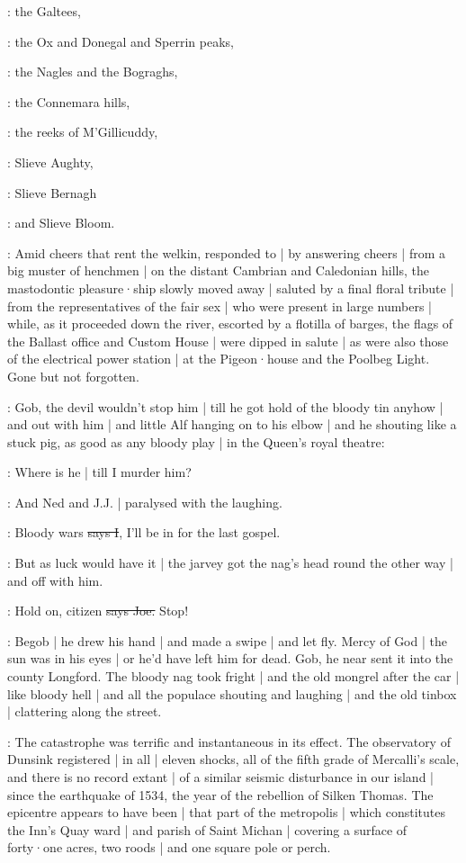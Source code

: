 :
the Galtees,

:
the Ox and Donegal and Sperrin peaks,

:
the Nagles and the Bograghs,

:
the Connemara hills,

:
the reeks of M'Gillicuddy,

:
Slieve Aughty,

:
Slieve Bernagh

:
and Slieve Bloom.

:
Amid cheers that rent the welkin,
responded to |
by answering cheers |
from a big muster of henchmen |
on the distant Cambrian and Caledonian hills,
the mastodontic pleasure·ship slowly moved away |
saluted by a final floral tribute |
from the representatives of the fair sex |
who were present in large numbers |
while,
as it proceeded down the river,
escorted by a flotilla of barges,
the flags of the Ballast office and Custom House |
were dipped in salute |
as were also those of the electrical power station |
at the Pigeon·house and the Poolbeg Light.
Gone but not forgotten.

\Nq:
Gob,
the devil wouldn't stop him |
till he got hold of the bloody tin anyhow |
and out with him |
and little Alf hanging on to his elbow |
and he shouting like a stuck pig,
as good as any bloody play |
in the Queen's royal theatre:

\citizen:
Where is he |
till I murder him?

\Nq:
And Ned and J.J. |
paralysed with the laughing.

:
Bloody wars
\sout{says I},
I'll be in for the last gospel.

\Nq:
But as luck would have it
 |
the jarvey got the nag's head round the other way |
and off with him.

\joe:
Hold on,
citizen
\sout{says Joe.}
Stop!

\Nq:
Begob |
he drew his hand |
and made a swipe |
and let fly.
Mercy of God |
the sun was in his eyes |
or he'd have left him for dead.
Gob,
he near sent it into the county Longford.
The bloody nag took fright |
and the old mongrel after the car |
like bloody hell |
and all the populace shouting and laughing |
and the old tinbox |
clattering along the street.

:
The catastrophe was terrific and instantaneous in its effect.
The observatory of Dunsink registered |
in all |
eleven shocks,
all of the fifth grade of Mercalli's scale,
and there is no record extant |
of a similar seismic disturbance in our island |
since the earthquake of 1534,
the year of the rebellion of Silken Thomas.
The epicentre appears to have been |
that part of the metropolis |
which constitutes the Inn's Quay ward |
and parish of Saint Michan |
covering a surface of forty·one acres,
two roods |
and one square pole or perch.

